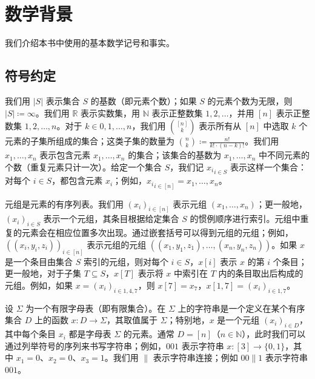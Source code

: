 \documentclass[american,singlepageview]{snargs-book-zh}
\newcommand{\Bits}{\{0,1\}}
\newcommand{\DefineEqual}{\coloneqq}
\newcommand{\concat}{\|}
\newcommand{\Cardinality}[1]{\left|{#1}\right|}
\newcommand{\Naturals}{\mathbb{N}}
\newcommand{\Reals}{\mathbb{R}}
\newcommand{\ProtoAlphabet}{\Sigma}
\begin{document}
\chapter{数学背景}
\label{chapter:mathematical-background}

我们介绍本书中使用的基本数学记号和事实。

\section{符号约定}
\label{section:notation}

我们用 $\Cardinality{S}$ 表示集合 $S$ 的基数（即元素个数）；如果 $S$ 的元素个数为无限，则 $\Cardinality{S} \DefineEqual \infty$。我们用 $\Reals$ 表示实数集，用 $\Naturals$ 表示正整数集 ${1,2,\dots}$，并用 $[n]$ 表示正整数集 ${1,2,\dots,n}$。对于 $k \in {0,1,\dots,n}$，我们用 $\binom{[n]}{k}$ 表示所有从 $[n]$ 中选取 $k$ 个元素的子集所组成的集合；这类子集的数量为 $\binom{n}{k} \DefineEqual \frac{n!}{k! \cdot (n-k)!}$。我们用 ${x_{1},\dots,x_{n}}$ 表示包含元素 $x_{1},\dots,x_{n}$ 的集合；该集合的基数为 $x_{1},\dots,x_{n}$ 中不同元素的个数（重复元素只计一次）。给定一个集合 $S$，我们记 ${x_{i}}_{i \in S}$ 表示这样一个集合：对每个 $i\in S$，都包含元素 $x_{i}$；例如，${x_{i}}_{i \in [n]}={x_{1},\dots,x_{n}}$。

元组是元素的有序列表。我们用 $(x_{i})_{i \in [n]}$ 表示元组 $(x_{1},\ldots,x_{n})$；更一般地，$(x_{i})_{i \in S}$ 表示一个元组，其条目根据给定集合 $S$ 的惯例顺序进行索引。元组中重复的元素会在相应位置多次出现。通过嵌套括号可以得到元组的元组；例如，$((x_{i},y_{i},z_{i}))_{i \in [n]}$ 表示元组的元组 $((x_{1},y_{1},z_{1}),\dots,(x_{n},y_{n},z_{n}))$。如果 $x$ 是一个条目由集合 $S$ 索引的元组，则对每个 $i\in S$，$x[i]$ 表示 $x$ 的第 $i$ 个条目；更一般地，对于子集 $T\subseteq S$，$x[T]$ 表示将 $x$ 中索引在 $T$ 内的条目取出后构成的元组。例如，如果 $x = (x_{i})_{i \in {1,4,7}}$，则 $x[7]=x_{7}$，$x[{1,7}]=(x_{i})_{i \in {1,7}}$。

设 $\ProtoAlphabet$ 为一个有限字母表（即有限集合）。在 $\ProtoAlphabet$ 上的字符串是一个定义在某个有序集合 $D$ 上的函数 $x \colon D \to \ProtoAlphabet$，其取值属于 $\ProtoAlphabet$；特别地，$x$ 是一个元组 $(x_{i})_{i \in D}$，其中每个条目 $x_{i}$ 都是字母表 $\ProtoAlphabet$ 的元素。通常 $D=[n]$（$n\in\Naturals$），此时我们可以通过列举符号的序列来书写字符串；例如，$001$ 表示字符串 $x \colon [3]\to\Bits$，其中 $x_{1}=0$、$x_{2}=0$、$x_{3}=1$。我们用 $\concat$ 表示字符串连接；例如 $00 \concat 1$ 表示字符串 $001$。
\end{document}
